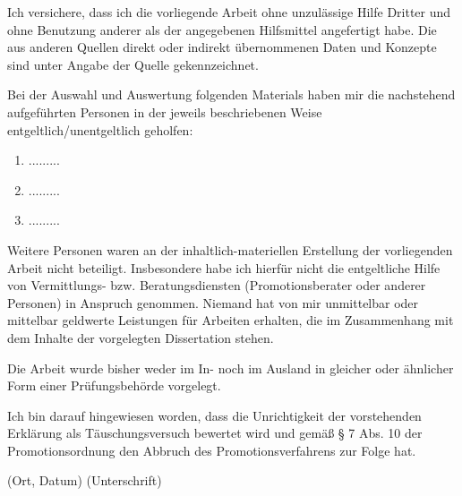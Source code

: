 
\bigskip

Ich versichere, dass ich die vorliegende Arbeit ohne unzulässige Hilfe Dritter und ohne Benutzung
anderer als der angegebenen Hilfsmittel angefertigt habe. Die aus anderen Quellen
direkt oder indirekt übernommenen Daten und Konzepte sind unter Angabe der Quelle gekennzeichnet.

Bei der Auswahl und Auswertung folgenden Materials haben mir die nachstehend aufgeführten
Personen in der jeweils beschriebenen Weise entgeltlich/unentgeltlich geholfen:

\begin{enumerate}
	\item .........
	\item .........
	\item .........
\end{enumerate}

Weitere Personen waren an der inhaltlich-materiellen Erstellung der vorliegenden Arbeit
nicht beteiligt. Insbesondere habe ich hierfür nicht die entgeltliche Hilfe von Vermittlungs- bzw.
Beratungsdiensten (Promotionsberater oder anderer Personen) in Anspruch genommen.
Niemand hat von mir unmittelbar oder mittelbar geldwerte Leistungen für Arbeiten
erhalten, die im Zusammenhang mit dem Inhalte der vorgelegten Dissertation stehen.

Die Arbeit wurde bisher weder im In- noch im Ausland in gleicher oder ähnlicher Form einer
Prüfungsbehörde vorgelegt.

Ich bin darauf hingewiesen worden, dass die Unrichtigkeit der vorstehenden Erklärung als
Täuschungsversuch bewertet wird und gemäß § 7 Abs. 10 der Promotionsordnung den Abbruch
des Promotionsverfahrens zur Folge hat.


\vfill

\hspace{3em} (Ort, Datum) \hfill (Unterschrift) \hspace{3em}

\bigskip
{}